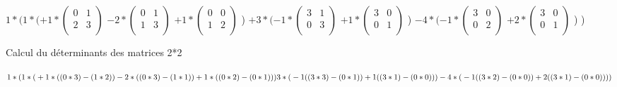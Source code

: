 $
1*(1*(
+1*
\begin{pmatrix}
  0 & 1 \\
  2 & 3 \\
\end{pmatrix}
$
$
-2*
\begin{pmatrix}
  0 & 1 \\
  1 & 3 \\
\end{pmatrix}
$
$
+1*
\begin{pmatrix}
  0 & 0 \\
  1 & 2 \\
\end{pmatrix}
$
)
  $
  +3*(
  -1*
  \begin{pmatrix}
    3 & 1 \\
    0 & 3 \\
  \end{pmatrix}
  $
  $
  +1*
  \begin{pmatrix}
    3 & 0 \\
    0 & 1 \\
  \end{pmatrix}
  $
  )
  $
  -4*(
  -1*
  \begin{pmatrix}
    3 & 0 \\
    0 & 2 \\
  \end{pmatrix}
  $
  $
  +2*
  \begin{pmatrix}
    3 & 0 \\
    0 & 1 \\
  \end{pmatrix}
  $
  )
)


\vspace{8mm} %
Calcul du déterminants des matrices 2*2
\vspace{5mm} %

$
1*(\\
  1*(\\
    +1*( (0*3) - (1*2))\\
    -2*( (0*3) - (1*1))\\
    +1*( (0*2) - (0*1))\\
    )\\
  3*(\\
    -1((3*3) - (0*1))\\
    +1((3*1) - (0*0))\\
    )\\
  -4*(\\
    -1((3*2) - (0*0))\\
    +2((3*1) - (0*0))\\
    )\\
  )\\
$


